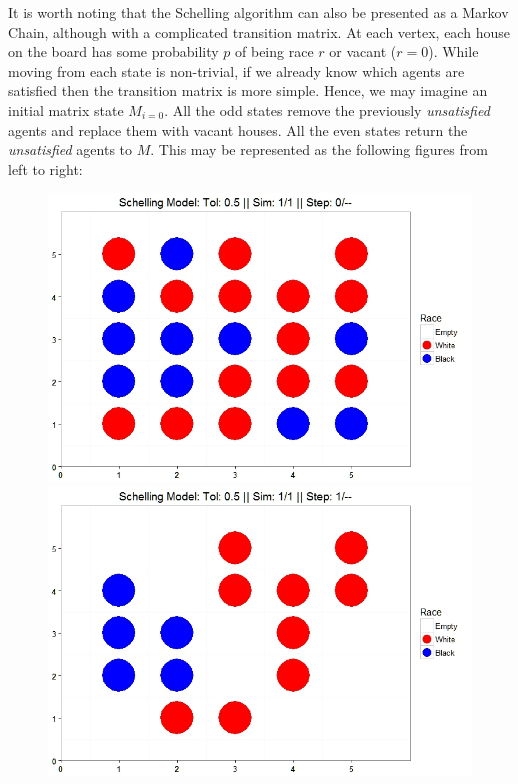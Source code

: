 {It is worth noting that the Schelling algorithm can also be presented as a Markov Chain, although with a complicated transition matrix. At each vertex, each house on the board has some probability $p$ of being race $r$ or vacant ($r=0$). While moving from each state is non-trivial, if we already know which agents are satisfied then the transition matrix is more simple. Hence, we may imagine an initial matrix state $M_{i=0}$. All the odd states remove the previously \textit{unsatisfied} agents and replace them with vacant houses. All the even states return the \textit{unsatisfied} agents to $M$. This may be represented as the following figures from left to right:

\begin{figure}[h!]
\begin{floatrow}
{%
\includegraphics[scale=0.25]{figures/EX0.jpeg}
}
{%
\includegraphics[scale=0.25]{figures/Ex1.jpeg}
}
\end{floatrow}
\end{figure}}

